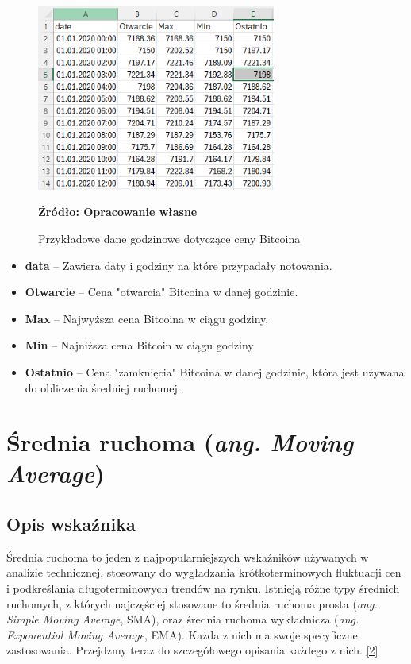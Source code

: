 \documentclass[12pt,a4paper,twoside, inzynierska]{pwr_wmat_praca_dyplomowa}
\theoremstyle{plain}
\numberwithin{theorem}{chapter}
\theoremstyle{definition}
\numberwithin{theorem}{chapter}
\begin{document}
	\begin{figure}[H]
		\centering
		\includegraphics[width=0.7\textwidth]{excelkolumny.png}
		\caption{Przykładowe dane godzinowe dotyczące ceny Bitcoina}
		\label{fig:excelkolumny}
		\textbf{Źródło: Opracowanie własne}
	\end{figure}
	\vspace{12pt} %

	\begin{itemize}
		\item \textbf{data} -- Zawiera daty i godziny na które przypadały notowania.
		\item \textbf{Otwarcie} -- Cena "otwarcia" Bitcoina w danej godzinie.
		\item \textbf{Max} -- Najwyższa cena Bitcoina w ciągu godziny.
		\item \textbf{Min} -- Najniższa cena Bitcoin w ciągu godziny
		\item \textbf{Ostatnio} -- Cena "zamknięcia" Bitcoina w danej godzinie, która jest używana do obliczenia średniej ruchomej.
	\end{itemize}


	\section{Średnia ruchoma (\textit{ang. Moving Average})}

	\subsection{Opis wskaźnika}
	Średnia ruchoma to jeden z najpopularniejszych wskaźników używanych w analizie technicznej, stosowany do wygładzania krótkoterminowych fluktuacji cen i podkreślania długoterminowych trendów na rynku. Istnieją różne typy średnich ruchomych, z których najczęściej stosowane to średnia ruchoma prosta (\textit{ang. Simple Moving Average}, SMA), oraz średnia ruchoma wykładnicza (\textit{ang. Exponential Moving Average}, EMA). Każda z nich ma swoje specyficzne zastosowania. Przejdzmy teraz do szczegółowego opisania każdego z nich. \hyperref[info2]{[2]}
	
\end{document}
